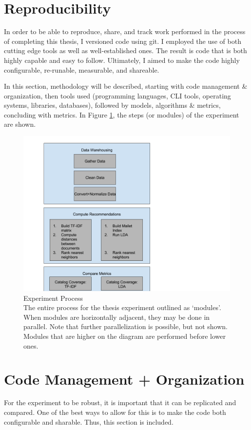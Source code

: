 \section{Reproducibility}
In order to be able to reproduce, share, and track work performed in the process of completing this thesis, I versioned code using git. I employed the use of both cutting edge tools as well as well-established ones. The result is code that is both highly capable and easy to follow. Ultimately, I aimed to make the code highly configurable, re-runable, measurable, and shareable.

In this section, methodology will be described, starting with code management \& organization, then tools used (programming languages, CLI tools, operating systems, libraries, databases), followed by models, algorithms \& metrics, concluding with metrics. In Figure \ref{fig:entire_process}, the steps (or modules) of the experiment are shown.

\begin{figure}[hhhhhtb]
	\centering
		\includegraphics[width=7.5in,natwidth=810,natheight=942]{figures/entire_process.png}
		\caption[Entire Process]{
			Experiment Process\\
			The entire process for the thesis experiment outlined as `modules'. When modules are horizontally adjacent, they may be done in parallel. Note that further parallelization is possible, but not shown. Modules that are higher on the diagram are performed before lower ones.
		}
	\label{fig:entire_process}
\end{figure}

\section{Code Management + Organization}
For the experiment to be robust, it is important that it can be replicated and compared. One of the best ways to allow for this is to make the code both configurable and sharable. Thus, this section is included.

